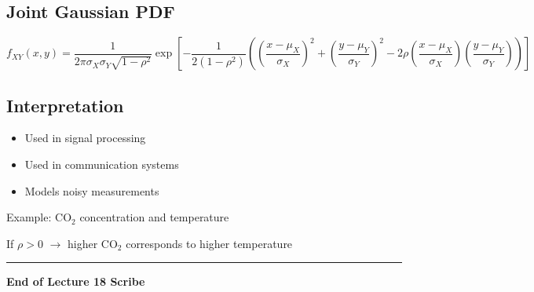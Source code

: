 \documentclass[12pt]{article}
\begin{document}
\subsection{Joint Gaussian PDF}

\[
f_{XY}(x,y) =
\frac{1}{2\pi\sigma_X\sigma_Y\sqrt{1-\rho^2}}
\exp\left[
-\frac{1}{2(1-\rho^2)}
\left(
\left(\frac{x-\mu_X}{\sigma_X}\right)^2
+
\left(\frac{y-\mu_Y}{\sigma_Y}\right)^2
-2\rho
\left(\frac{x-\mu_X}{\sigma_X}\right)
\left(\frac{y-\mu_Y}{\sigma_Y}\right)
\right)
\right]
\]

\subsection{Interpretation}

\begin{itemize}
\item Used in signal processing
\item Used in communication systems
\item Models noisy measurements
\end{itemize}

Example: CO$_2$ concentration and temperature

If $\rho > 0$ $\rightarrow$ higher CO$_2$ corresponds to higher temperature

\hrule
\vspace{0.5cm}

\begin{center}
\textbf{End of Lecture 18 Scribe}
\end{center}
\end{document}
